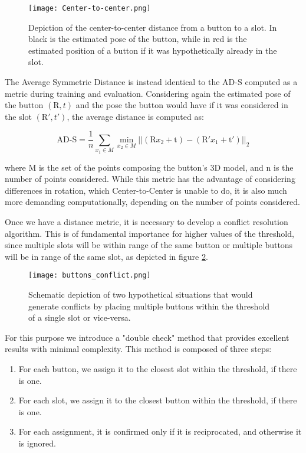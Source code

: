 \begin{figure}[ht]
    \texttt{[image: Center-to-center.png]}
    \caption{Depiction of the center-to-center distance from a button to a slot. In black is the estimated pose of the button, while in red is the estimated position of a button if it was hypothetically already in the slot.}
    \label{fig:center2center}
\end{figure}

The Average Symmetric Distance is instead identical to the AD-S computed as a metric during training and evaluation. Considering again the estimated pose of the button $(\text{R}, t)$ and the pose the button would have if it was considered in the slot $(\text{R}', t')$, the average distance is computed as:

\begin{equation*}
    \text{AD-S} = \frac{1}{n} \sum_{x_1 \in M} \min_{x_2 \in M} ||(\text{R}x_2 + \text{t}) - 
    (\text{R}'x_1 + \text{t}')||_2
\end{equation*}

where M is the set of the points composing the button's 3D model, and n is the number of points considered. While this metric has the advantage of considering differences in rotation, which Center-to-Center is unable to do, it is also much more demanding computationally, depending on the number of points considered.

Once we have a distance metric, it is necessary to develop a conflict resolution algorithm. This is of fundamental importance for higher values of the threshold, since multiple slots will be within range of the same button or multiple buttons will be in range of the same slot, as depicted in figure \ref{fig:conflicts}.

\begin{figure}[ht]
    \texttt{[image: buttons\_conflict.png]}
    \caption{Schematic depiction of two hypothetical situations that would generate conflicts by placing multiple buttons within the threshold of a single slot or vice-versa.}
    \label{fig:conflicts}
\end{figure}

For this purpose we introduce a "double check" method that provides excellent results with minimal complexity. This method is composed of three steps:

\begin{enumerate}
    \item For each button, we assign it to the closest slot within the threshold, if there is one.
    \item For each slot, we assign it to the closest button within the threshold, if there is one.
    \item For each assignment, it is confirmed only if it is reciprocated, and otherwise it is ignored.
\end{enumerate}

